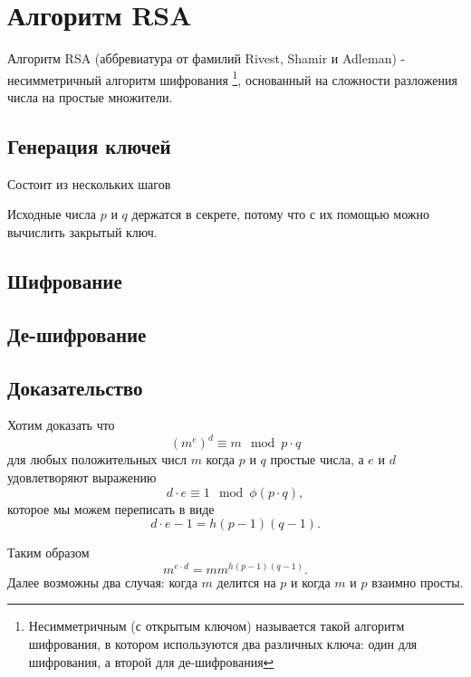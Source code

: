 \section{Алгоритм RSA}
\label{AddRSA}
Алгоритм RSA (аббревиатура от фамилий Rivest, Shamir и Adleman) - 
несимметричный алгоритм шифрования
\footnote{Несимметричным (с открытым ключом) называется такой алгоритм
  шифрования, в 
  котором используются два различных ключа: один для шифрования, а
  второй для де-шифрования},  
основанный на сложности разложения числа на простые множители.  

\subsection{Генерация ключей}
Состоит из нескольких шагов


Исходные числа $p$ и $q$ держатся в секрете, потому что с их помощью
можно вычислить закрытый ключ.



\subsection{Шифрование}


\subsection{Де-шифрование}


\subsection{Доказательство}
Хотим доказать что 
\[
\left(m^e\right)^d \equiv m \mod{p \cdot q}
\]
для любых положительных числ $m$ когда $p$ и $q$ простые числа, а $e$
и $d$ удовлетворяют выражению
\[
d \cdot e \equiv 1 \mod{\phi\left(p \cdot q\right)},
\]
которое мы можем переписать в виде
\[
d \cdot e - 1 = h \left(p - 1\right)\left(q - 1\right).
\]

Таким образом
\[
m^{e\cdot d} =m m^{h \left(p - 1\right)\left(q - 1\right)}.
\]
Далее возможны два случая: когда $m$ делится на $p$ и когда $m$ и $p$
взаимно просты.

